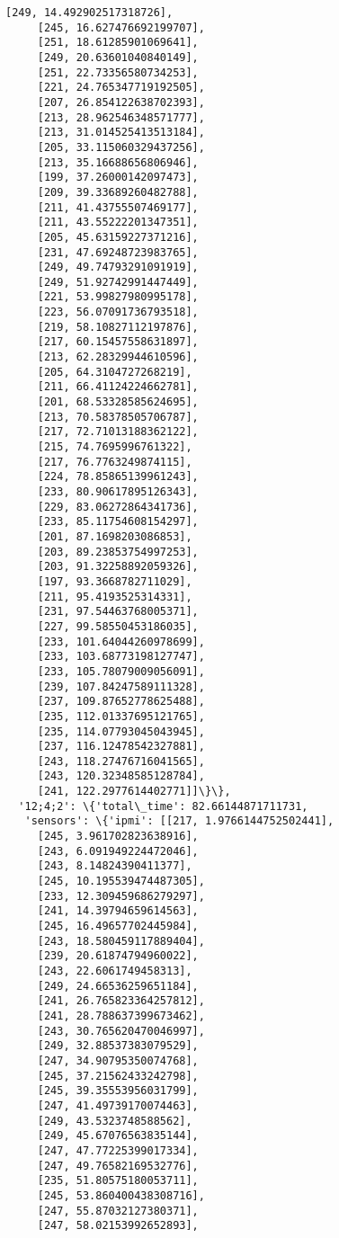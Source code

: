 \documentclass[11pt]{article}
\begin{document}
\begin{tcolorbox}[breakable, size=fbox, boxrule=.5pt, pad at break*=1mm, opacityfill=0]
\begin{Verbatim}[commandchars=\\\{\}]
     [249, 14.492902517318726],
     [245, 16.627476692199707],
     [251, 18.61285901069641],
     [249, 20.63601040840149],
     [251, 22.73356580734253],
     [221, 24.765347719192505],
     [207, 26.854122638702393],
     [213, 28.962546348571777],
     [213, 31.014525413513184],
     [205, 33.115060329437256],
     [213, 35.16688656806946],
     [199, 37.26000142097473],
     [209, 39.33689260482788],
     [211, 41.43755507469177],
     [211, 43.55222201347351],
     [205, 45.63159227371216],
     [231, 47.69248723983765],
     [249, 49.74793291091919],
     [249, 51.92742991447449],
     [221, 53.99827980995178],
     [223, 56.07091736793518],
     [219, 58.10827112197876],
     [217, 60.15457558631897],
     [213, 62.28329944610596],
     [205, 64.3104727268219],
     [211, 66.41124224662781],
     [201, 68.53328585624695],
     [213, 70.58378505706787],
     [217, 72.71013188362122],
     [215, 74.7695996761322],
     [217, 76.7763249874115],
     [224, 78.85865139961243],
     [233, 80.90617895126343],
     [229, 83.06272864341736],
     [233, 85.11754608154297],
     [201, 87.1698203086853],
     [203, 89.23853754997253],
     [203, 91.32258892059326],
     [197, 93.3668782711029],
     [211, 95.4193525314331],
     [231, 97.54463768005371],
     [227, 99.58550453186035],
     [233, 101.64044260978699],
     [233, 103.68773198127747],
     [233, 105.78079009056091],
     [239, 107.84247589111328],
     [237, 109.87652778625488],
     [235, 112.01337695121765],
     [235, 114.07793045043945],
     [237, 116.12478542327881],
     [243, 118.27476716041565],
     [243, 120.32348585128784],
     [241, 122.2977614402771]]\}\},
  '12;4;2': \{'total\_time': 82.66144871711731,
   'sensors': \{'ipmi': [[217, 1.9766144752502441],
     [245, 3.961702823638916],
     [243, 6.091949224472046],
     [243, 8.14824390411377],
     [245, 10.195539474487305],
     [233, 12.309459686279297],
     [241, 14.39794659614563],
     [245, 16.49657702445984],
     [243, 18.580459117889404],
     [239, 20.61874794960022],
     [243, 22.6061749458313],
     [249, 24.66536259651184],
     [241, 26.765823364257812],
     [241, 28.788637399673462],
     [243, 30.765620470046997],
     [249, 32.88537383079529],
     [247, 34.90795350074768],
     [245, 37.21562433242798],
     [245, 39.35553956031799],
     [247, 41.49739170074463],
     [249, 43.5323748588562],
     [249, 45.67076563835144],
     [247, 47.77225399017334],
     [247, 49.76582169532776],
     [235, 51.80575180053711],
     [245, 53.860400438308716],
     [247, 55.87032127380371],
     [247, 58.02153992652893],

\end{Verbatim}
\end{tcolorbox}
\end{document}
